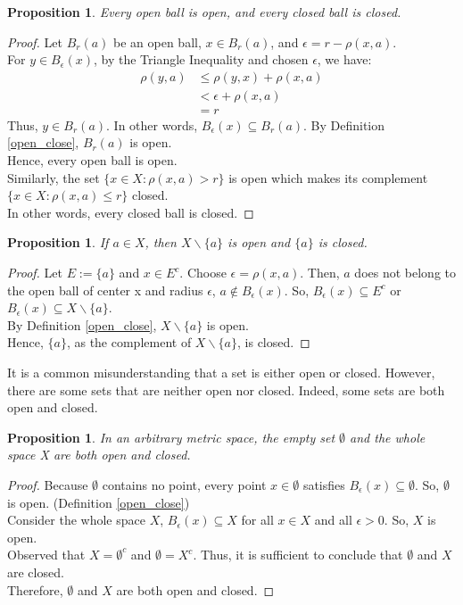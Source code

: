 \documentclass[12pt, reqno]{amsart}
\newtheorem{proposition}[theorem]{Proposition}
\theoremstyle{definition}
\numberwithin{equation}{section}
\begin{document}
\begin{proposition} \cite{s1}
    \textit{Every open ball is open, and every closed ball is closed.}
\end{proposition}
\begin{proof}
    Let $B_r(a)$ be an open ball, $x \in B_r(a)$, and $\epsilon = r-\rho(x,a)$.\\
    For $y \in B_\epsilon(x)$, by the Triangle Inequality and chosen $\epsilon$, we have:
        \begin{align*}
        \rho(y,a) &\leq \rho(y,x) + \rho(x,a) \\
                  &< \epsilon + \rho(x,a)\\
                  &= r
        \end{align*}
    Thus, $y \in B_r(a)$. In other words, $B_\epsilon(x) \subseteq B_r(a)$. By Definition \ref{open_close}, $B_r(a)$ is open.\\
    Hence, every open ball is open.\\
    Similarly, the set $\{x \in X : \rho(x,a) > r\}$ is open which makes its complement ${\{x \in X : \rho(x,a) \leq r\}}$ closed.\\
    In other words, every closed ball is closed.
\end{proof}
\begin{proposition} \cite{s1}
    \textit{If $a \in X$, then $X \backslash \{a\}$ is open and $\{a\}$ is closed.}
\end{proposition}
\begin{proof}
    Let $E := \{a\}$ and $x \in E^c$. Choose $\epsilon = \rho(x,a)$.
    Then, $a$ does not belong to the open ball of center x and radius $\epsilon$, $a \notin B_\epsilon(x)$. So, $B_\epsilon(x) \subseteq E^c$ or $B_\epsilon(x) \subseteq X \backslash \{a\}$. \\
    By Definition \ref{open_close}, $X \backslash \{a\}$ is open.\\
    Hence, $\{a\}$, as the complement of $X \backslash \{a\}$, is closed.
\end{proof}
It is a common misunderstanding that a set is either open or closed. However, there are some sets that are neither open nor closed. Indeed, some sets are both open and closed.
\begin{proposition} \cite{s1}
    \textit{In an arbitrary metric space, the empty set $\emptyset$ and the whole space X are both open and closed.}
\end{proposition}
\begin{proof}
    Because $\emptyset$ contains no point, every point $x \in \emptyset$ satisfies $B_\epsilon(x) \subseteq \emptyset$. So, $\emptyset$ is open. (Definition \ref{open_close})\\
    Consider the whole space $X$, $B_\epsilon(x) \subseteq X$ for all $x \in X$ and all $\epsilon >0$. So, $X$ is open.\\
    Observed that $X = \emptyset^c$ and $\emptyset = X^c$. Thus, it is sufficient to conclude that $\emptyset$ and $X$ are closed.\\
    Therefore, $\emptyset$ and $X$ are both open and closed.
\end{proof}
\end{document}
